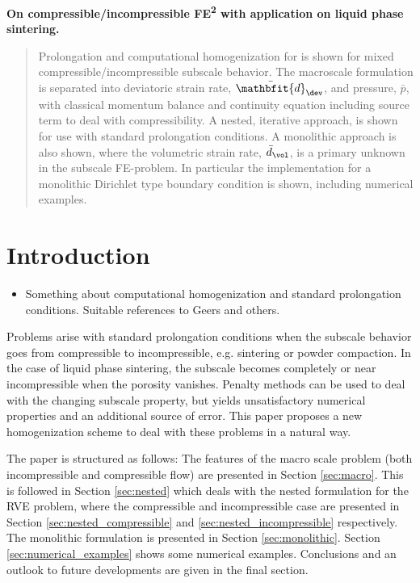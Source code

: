 \documentclass[a4paper,11pt]{article}
\renewcommand{\ts}[1]{\mathbfit{#1}}
\begin{document}
\begin{center}
 \Large\bfseries On compressible/incompressible FE\textsuperscript{2} with application on liquid phase sintering.
\end{center}
\begin{abstract}
\noindent Prolongation and computational homogenization for is shown for mixed compressible\-/\-incompressible subscale behavior.
The macroscale formulation is separated into deviatoric strain rate, $\bar{\ts d}_\dev$, and pressure, $\bar{p}$, 
with classical momentum balance and continuity equation including source term to deal with compressibility.
A nested, iterative approach, is shown for use with standard prolongation conditions.
A monolithic approach is also shown, where the volumetric strain rate, $\bar{d}_\vol$, is a primary unknown in the subscale FE-problem.
In particular the implementation for a monolithic Dirichlet type boundary condition is shown, including numerical examples.
\end{abstract}

\section{Introduction}
\begin{itemize}
 \item Something about computational homogenization and standard prolongation conditions. Suitable references to Geers and others.
\end{itemize}

Problems arise with standard prolongation conditions when the subscale behavior goes from compressible to incompressible, e.g. sintering or powder compaction.
In the case of liquid phase sintering, the subscale becomes completely or near incompressible when the porosity vanishes. 
Penalty methods can be used to deal with the changing subscale property, but yields unsatisfactory numerical properties and an additional source of error.
This paper proposes a new homogenization scheme to deal with these problems in a natural way.

The paper is structured as follows: 
The features of the macro scale problem (both incompressible and compressible flow) are presented in Section \ref{sec:macro}.
This is followed in Section \ref{sec:nested} which deals with the nested formulation for the RVE problem, 
where the compressible and incompressible case are presented in Section \ref{sec:nested_compressible} and \ref{sec:nested_incompressible} respectively.
The monolithic formulation is presented in Section \ref{sec:monolithic}. Section \ref{sec:numerical_examples} shows some numerical examples.
Conclusions and an outlook to future developments are given in the final section.
\end{document}
